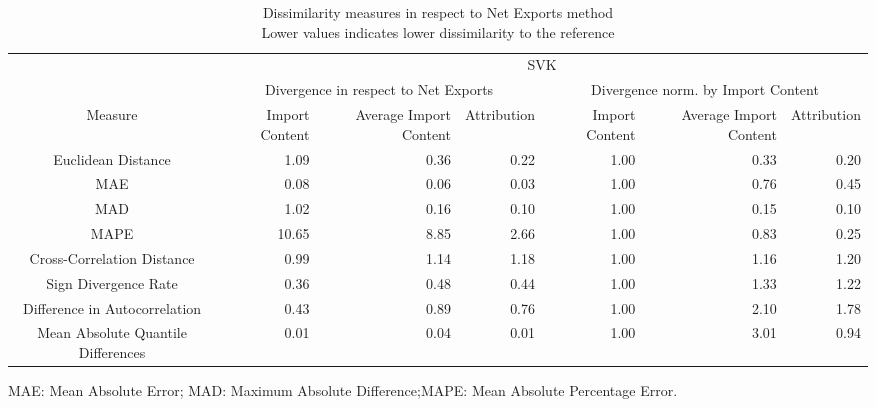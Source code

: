 \begin{table}[t]
\caption*{
{\large Dissimilarity measures in respect to Net Exports method} \\ 
{\small Lower values indicates lower dissimilarity to the reference}
} 
\fontsize{15.0pt}{18.0pt}\selectfont
\begin{tabular*}{\linewidth}{@{\extracolsep{\fill}}crrrrrr}
\toprule
 & \multicolumn{6}{c}{SVK} \\ 
\cmidrule(lr){2-7}
 & \multicolumn{3}{c}{Divergence in respect to Net Exports} & \multicolumn{3}{c}{Divergence norm. by Import Content} \\ 
\cmidrule(lr){2-4} \cmidrule(lr){5-7}
Measure & Import Content & Average Import Content & Attribution & Import Content & Average Import Content & Attribution \\ 
\midrule\addlinespace[2.5pt]
Euclidean Distance & 1.09 & 0.36 & 0.22 & 1.00 & 0.33 & 0.20 \\ 
MAE & 0.08 & 0.06 & 0.03 & 1.00 & 0.76 & 0.45 \\ 
MAD & 1.02 & 0.16 & 0.10 & 1.00 & 0.15 & 0.10 \\ 
MAPE & 10.65 & 8.85 & 2.66 & 1.00 & 0.83 & 0.25 \\ 
Cross-Correlation Distance & 0.99 & 1.14 & 1.18 & 1.00 & 1.16 & 1.20 \\ 
Sign Divergence Rate & 0.36 & 0.48 & 0.44 & 1.00 & 1.33 & 1.22 \\ 
Difference in Autocorrelation & 0.43 & 0.89 & 0.76 & 1.00 & 2.10 & 1.78 \\ 
Mean Absolute Quantile Differences & 0.01 & 0.04 & 0.01 & 1.00 & 3.01 & 0.94 \\ 
\bottomrule
\end{tabular*}
\begin{minipage}{\linewidth}
MAE: Mean Absolute Error; MAD: Maximum Absolute Difference;MAPE: Mean Absolute Percentage Error.\\
\end{minipage}
\end{table}

